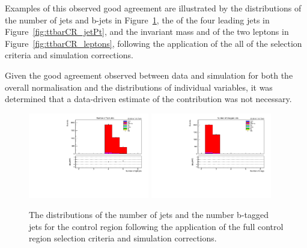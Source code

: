 Examples of this observed good agreement are illustrated by the distributions of the number of jets and b-jets in Figure~\ref{fig:ttbarCR_nJets}, the \pT of the four leading jets in Figure~\ref{fig:ttbarCR_jetPt}, and the invariant mass and \pT of the two leptons in Figure~\ref{fig:ttbarCR_leptons}, following the application of the all of the selection criteria and simulation corrections.

Given the good agreement observed between data and simulation for both the overall normalisation and the distributions of individual variables, it was determined that a data-driven estimate of the \ttbar contribution was not necessary.

\begin{figure}[tbp]
\centering
\includegraphics[width=0.47\textwidth]{figs/background-estimation/plots/unblinded/ttbar_control/numJets_wMass.pdf}
\includegraphics[width=0.47\textwidth]{figs/background-estimation/plots/unblinded/ttbar_control/numBJets_Wmass.pdf}
\caption{
The distributions of the number of jets and the number b-tagged jets for the \ttbar control region following the application of the full control region selection criteria and simulation corrections.
}
\label{fig:ttbarCR_nJets}
\end{figure}

